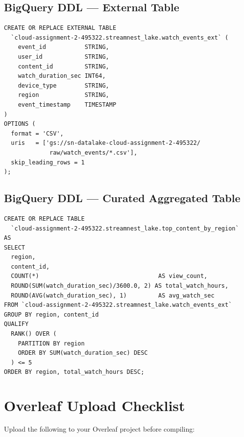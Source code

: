 \documentclass[12pt, a4paper]{article}
\begin{document}
\subsection{BigQuery DDL — External Table}

\begin{lstlisting}[style=sqlstyle]
CREATE OR REPLACE EXTERNAL TABLE
  `cloud-assignment-2-495322.streamnest_lake.watch_events_ext` (
    event_id           STRING,
    user_id            STRING,
    content_id         STRING,
    watch_duration_sec INT64,
    device_type        STRING,
    region             STRING,
    event_timestamp    TIMESTAMP
)
OPTIONS (
  format = 'CSV',
  uris   = ['gs://sn-datalake-cloud-assignment-2-495322/
             raw/watch_events/*.csv'],
  skip_leading_rows = 1
);
\end{lstlisting}

\subsection{BigQuery DDL — Curated Aggregated Table}

\begin{lstlisting}[style=sqlstyle]
CREATE OR REPLACE TABLE
  `cloud-assignment-2-495322.streamnest_lake.top_content_by_region`
AS
SELECT
  region,
  content_id,
  COUNT(*)                                  AS view_count,
  ROUND(SUM(watch_duration_sec)/3600.0, 2) AS total_watch_hours,
  ROUND(AVG(watch_duration_sec), 1)         AS avg_watch_sec
FROM `cloud-assignment-2-495322.streamnest_lake.watch_events_ext`
GROUP BY region, content_id
QUALIFY
  RANK() OVER (
    PARTITION BY region
    ORDER BY SUM(watch_duration_sec) DESC
  ) <= 5
ORDER BY region, total_watch_hours DESC;
\end{lstlisting}

\section{Overleaf Upload Checklist}

Upload the following to your Overleaf project before compiling:
\end{document}
